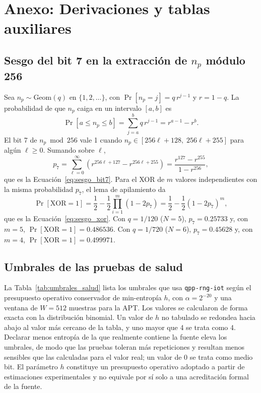 \chapter{Anexo: Derivaciones y tablas auxiliares}
\label{anexo:derivaciones}

\section{Sesgo del bit 7 en la extracción de \texorpdfstring{$n_p$}{np} módulo 256}

Sea $n_p \sim \text{Geom}(q)$ en $\{1, 2, \ldots\}$, con $\Pr[n_p = j] = q\, r^{j-1}$ y $r = 1 - q$. La probabilidad de que $n_p$ caiga en un intervalo $[a, b]$ es
\begin{equation}
    \Pr[a \leq n_p \leq b] = \sum_{j=a}^{b} q\, r^{j-1} = r^{a-1} - r^{b}.
\end{equation}
El bit 7 de $n_p \bmod 256$ vale 1 cuando $n_p \in [256\ell + 128,\; 256\ell + 255]$ para algún $\ell \geq 0$. Sumando sobre $\ell$,
\begin{equation}
    p_7 = \sum_{\ell = 0}^{\infty} \left( r^{256\ell + 127} - r^{256\ell + 255} \right) = \frac{r^{127} - r^{255}}{1 - r^{256}},
\end{equation}
que es la Ecuación~\eqref{eq:sesgo_bit7}. Para el XOR de $m$ valores independientes con la misma probabilidad $p_7$, el lema de apilamiento da
\begin{equation}
    \Pr[\text{XOR} = 1] = \frac{1}{2} - \frac{1}{2} \prod_{i=1}^{m} (1 - 2p_7) = \frac{1}{2} - \frac{1}{2}(1 - 2p_7)^m,
\end{equation}
que es la Ecuación~\eqref{eq:sesgo_xor}. Con $q = 1/120$ ($N = 5$), $p_7 = 0.25733$ y, con $m = 5$, $\Pr[\text{XOR} = 1] = 0.486536$. Con $q = 1/720$ ($N = 6$), $p_7 = 0.45628$ y, con $m = 4$, $\Pr[\text{XOR} = 1] = 0.499971$.

\section{Umbrales de las pruebas de salud}

La Tabla~\ref{tab:umbrales_salud} lista los umbrales que usa \texttt{qpp-rng-iot} según el presupuesto operativo conservador de min-entropía $h$, con $\alpha = 2^{-20}$ y una ventana de $W = 512$ muestras para la APT. Los valores se calcularon de forma exacta con la distribución binomial. Un valor de $h$ no tabulado se redondea hacia abajo al valor más cercano de la tabla, y uno mayor que 4 se trata como 4. Declarar menos entropía de la que realmente contiene la fuente eleva los umbrales, de modo que las pruebas toleran más repeticiones y resultan menos sensibles que las calculadas para el valor real; un valor de 0 se trata como medio bit. El parámetro $h$ constituye un presupuesto operativo adoptado a partir de estimaciones experimentales y no equivale por sí solo a una acreditación formal de la fuente.

